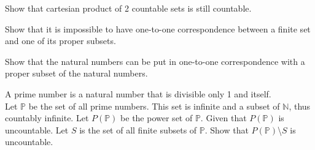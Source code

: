 \documentclass{exam}
\begin{document}
\begin{questions}
\begin{solution}
    \end{solution}

    \question Show that cartesian product of 2 countable sets is still countable.
    \begin{solution}
        
    \end{solution}

    \question Show that it is impossible to have one-to-one correspondence between a finite set and one of its proper subsets. 
    \begin{solution}
        
    \end{solution}

    \question Show that the natural numbers can be put in one-to-one correspondence with a proper subset of the natural numbers.
    \begin{solution}
        
    \end{solution}

    \question A prime number is a natural number that is divisible only 1 and itself.
    \\Let $\mathbb{P}$ be the set of all prime numbers. This set is infinite and a subset of $\mathbb{N}$, thus countably infinite. Let $P(\mathbb{P})$ be the power set of $\mathbb{P}$. Given that $P(\mathbb{P})$ is uncountable. Let $S$ is the set of all finite subsets of $\mathbb{P}$. Show that $P(\mathbb{P})$\textbackslash$S$ is uncountable.
    \begin{solution}
        
    \end{solution}
    
\end{questions}
\end{document}
